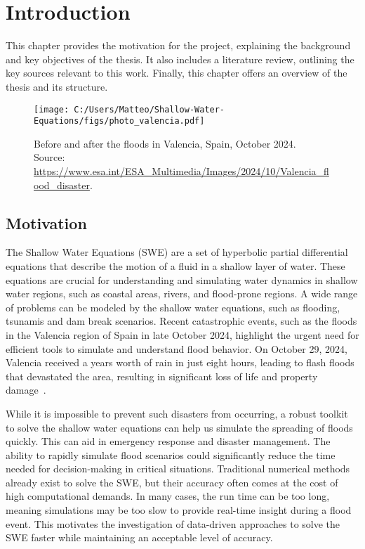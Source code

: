 \chapter{Introduction}
This chapter provides the motivation for the project, explaining the background and key objectives of the thesis.
It also includes a literature review, outlining the key sources relevant to this work.
Finally, this chapter offers an overview of the thesis and its structure.

\begin{figure}[H]
    \centering
    \texttt{[image: C:/Users/Matteo/Shallow-Water-Equations/figs/photo\_valencia.pdf]}
    \caption{Before and after the floods in Valencia, Spain, October 2024.\\
            Source: \url{https://www.esa.int/ESA_Multimedia/Images/2024/10/Valencia_flood_disaster}.}
\end{figure}

\section{Motivation}
The Shallow Water Equations (SWE) are a set of hyperbolic partial differential equations that describe the motion of a fluid in a shallow layer of water.
These equations are crucial for understanding and simulating water dynamics in shallow water regions, such as coastal areas, rivers, and flood-prone regions.
A wide range of problems can be modeled by the shallow water equations, such as flooding, tsunamis and dam break scenarios.
Recent catastrophic events, such as the floods in the Valencia region of Spain in late October 2024, highlight the urgent need for efficient tools to simulate and understand flood behavior.
On October 29, 2024, Valencia received a years worth of rain in just eight hours, leading to flash floods that devastated the area, resulting in significant loss of life and property damage~\cite{valencia_flood_disaster_esa}.

While it is impossible to prevent such disasters from occurring, a robust toolkit to solve the shallow water equations can help us simulate the spreading of floods quickly.
This can aid in emergency response and disaster management.
The ability to rapidly simulate flood scenarios could significantly reduce the time needed for decision-making in critical situations.
Traditional numerical methods already exist to solve the SWE, but their accuracy often comes at the cost of high computational demands.
In many cases, the run time can be too long, meaning simulations may be too slow to provide real-time insight during a flood event.
This motivates the investigation of data-driven approaches to solve the SWE faster while maintaining an acceptable level of accuracy.

